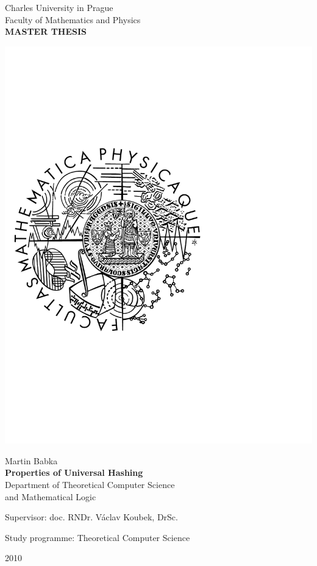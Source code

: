 \begin{titlepage}
\begin{center}

\large
Charles University in Prague\\
Faculty of Mathematics and Physics\\

\vspace{5mm}
{\Large\bf MASTER THESIS}

\vspace{55mm}
\includegraphics[scale=0.45,viewport=0 0 371 365]{images/logo}

\vspace{11mm}
{\Large Martin Babka}\\
\vspace{5mm}
{\Large\bf Properties of Universal Hashing}\\
\vspace{5mm}
Department of Theoretical Computer Science\\ and Mathematical Logic\\
\end{center}
\vspace{15mm}

\large\centering\noindent Supervisor: doc. RNDr. Václav Koubek, DrSc.\\
\vspace{5mm} 

\centering\noindent Study programme: Theoretical Computer Science
\vspace{\fill}

\begin{center}
2010
\end{center}

\end{titlepage}